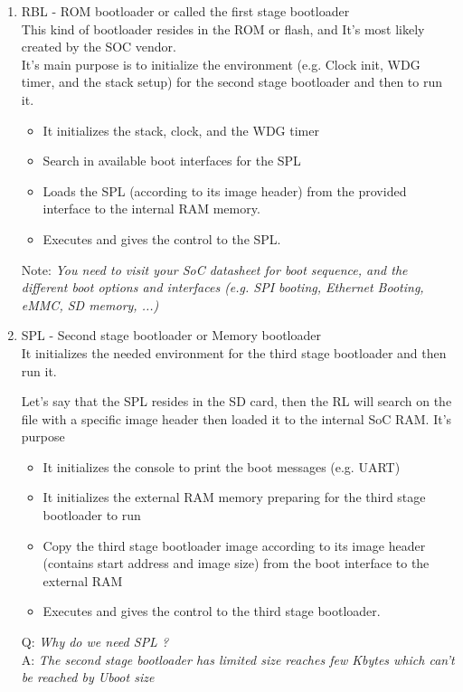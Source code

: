 \documentclass{article}
\begin{document}
\begin{enumerate}
    \item RBL - ROM bootloader or called the first stage bootloader\\
    This kind of bootloader resides in the ROM or flash, and It's most likely created by the SOC vendor.\\ 
    It's main purpose is to initialize the environment (e.g. Clock init, WDG timer, and the stack setup) for the second stage bootloader and then to run it.  
    \begin{itemize}
        \item It initializes the stack, clock, and the WDG timer
        \item Search in available boot interfaces for the SPL
        \item Loads the SPL (according to its image header) from the provided interface to the internal RAM memory.
        \item Executes and gives the control to the SPL.
    \end{itemize}
    
    Note: \textit{You need to visit your SoC datasheet for boot sequence, and the different boot options and interfaces (e.g. SPI booting, Ethernet Booting, eMMC, SD memory, ...)} 

    \item  SPL - Second stage bootloader or Memory bootloader\\
    It initializes the needed environment for the third stage bootloader and then run it.

    Let's say that the SPL resides in the SD card, then the RL will search on the file with a specific image header then loaded it to the internal SoC RAM.
    It's purpose
    \begin{itemize}
        \item It initializes the console to print the boot messages (e.g. UART)
        \item It initializes the external RAM memory preparing for the third stage bootloader to run
        \item Copy the third stage bootloader image according to its image header (contains start address and image size) from the boot interface to the external RAM
        \item Executes and gives the control to the third stage bootloader.
    \end{itemize}
    
    Q: \textit{Why do we need SPL ?} \\
    A: \textit{The second stage bootloader has limited size reaches few Kbytes which can't be reached by Uboot size} 


\end{enumerate}
\end{document}
